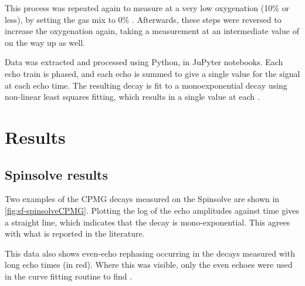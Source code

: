 This process was repeated again to measure \Ttwo at a very low oxygenation (10\% or less), by setting the gas mix to 0\% \Otwo.
Afterwards, these steps were reversed to increase the oxygenation again, taking a measurement at an intermediate value of \SOtwo on the way up as well.

Data was extracted and processed using Python, in JuPyter notebooks.
Each echo train is phased, and each echo is summed to give a single value for the signal at each echo time.
The resulting decay is fit to a monoexponential decay using non-linear least squares fitting, which results in a single \Ttwo value at each \SOtwo.

\section{Results}
\subsection{Spinsolve results}
Two examples of the CPMG decays measured on the Spinsolve are shown in \autoref{fig:sf-spinsolveCPMG}.
Plotting the log of the echo amplitudes against time gives a straight line, which indicates that the decay is mono-exponential.
This agrees with what is reported in the literature.

This data also shows even-echo rephasing occurring in the decays measured with long echo times (in red).
Where this was visible, only the even echoes were used in the curve fitting routine to find \Ttwo.

